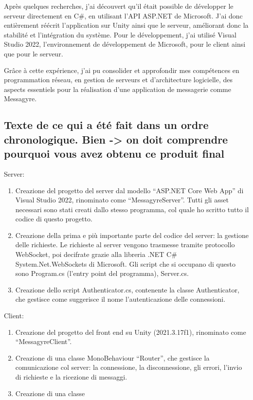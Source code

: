 \documentclass{article}
\begin{document}
Après quelques recherches, j’ai découvert qu’il était possible de développer le serveur directement en C\#, en utilisant l’API ASP.NET de Microsoft. J’ai donc entièrement réécrit l’application sur Unity ainsi que le serveur, améliorant donc la stabilité et l’intégration du système. Pour le développement, j’ai utilisé Visual Studio 2022, l’environnement de développement de Microsoft, pour le client ainsi que pour le serveur.

Grâce à cette expérience, j’ai pu consolider et approfondir mes compétences en programmation réseau, en gestion de serveurs et d’architecture logicielle, des aspects essentiels pour la réalisation d’une application de messagerie comme Messagyre.

\subsection{Texte de ce qui a été fait dans un ordre chronologique. Bien -> on doit comprendre pourquoi vous avez obtenu ce produit final}Server:

\begin{enumerate}
    \item Creazione del progetto del server dal modello “ASP.NET Core Web App” di Visual Studio 2022, rinominato come “MessagyreServer”. Tutti gli asset necessari sono stati creati dallo stesso programma, col quale ho scritto tutto il codice di questo progetto. 
    \item Creazione della prima e più importante parte del codice del server: la gestione delle richieste. Le richieste al server vengono trasmesse tramite protocollo WebSocket, poi decifrate grazie alla libreria .NET C\# System.Net.WebSockets di Microsoft. Gli script che si occupano di questo sono Program.cs (l’entry point del programma), Server.cs.
    \item Creazione dello script Authenticator.cs, contenente la classe Authenticator, che gestisce come suggerisce il nome l’autenticazione delle connessioni.

\end{enumerate}

Client:

\begin{enumerate}
    \item Creazione del progetto del front end su Unity (2021.3.17f1), rinominato come “MessagyreClient”. 
    \item Creazione di una classe MonoBehaviour “Router”, che gestisce la comunicazione col server: la connessione, la disconnessione, gli errori, l’invio di richieste e la ricezione di messaggi.
    \item Creazione di una classe 
\end{enumerate}
\end{document}
